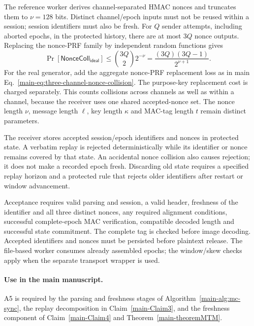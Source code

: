 \documentclass[journal]{IEEEtran}
\theoremstyle{definition}
\theoremstyle{game}
\begin{document}
The reference worker derives channel-separated HMAC nonces and truncates
them to $\nu=128$ bits. Distinct channel/epoch inputs must not be reused
within a session; session identifiers must also be fresh. For $Q$ sender attempts, including aborted epochs,
in the protected history, there are at most $3Q$ nonce outputs.
Replacing the nonce-PRF family by independent random functions gives
\begin{equation}\label{supp-eq:nonce-collision}
\Pr[\mathsf{NonceColl}_{\mathsf{ideal}}]
\le\binom{3Q}{2}2^{-\nu}
=\frac{(3Q)(3Q-1)}{2^{\nu+1}}.
\end{equation}
For the real generator, add the aggregate nonce-PRF replacement loss
as in main Eq.~\eqref{main-eq:three-channel-nonce-collision}.
The purpose-key replacement cost is charged separately. This counts
collisions across channels as well as within a channel, because the
receiver uses one shared accepted-nonce set.
The nonce length $\nu$, message length $\ell$, key length $\kappa$ and
MAC-tag length $t$ remain distinct parameters.

The receiver stores accepted session/epoch identifiers and nonces in
protected state. A verbatim replay is rejected deterministically while
its identifier or nonce remains covered by that state. An accidental
nonce collision also causes rejection; it does not make a recorded epoch
fresh. Discarding old state requires a specified replay horizon and a
protected rule that rejects older identifiers after restart or window
advancement.

Acceptance requires valid parsing and session, a valid header, freshness
of the identifier and all three distinct nonces, any required alignment
conditions, successful complete-epoch MAC verification, compatible decoded
length and successful state commitment. The complete tag is checked before
image decoding. Accepted identifiers and nonces must be persisted before
plaintext release. The file-based worker consumes already assembled epochs;
the window/skew checks apply when the separate transport wrapper is used.

\paragraph{Use in the main manuscript.}
A5 is required by the parsing and freshness stages of
Algorithm~\ref{main-alg:mc-sync}, the replay decomposition in
Claim~\ref{main-Claim3}, and the
freshness component of Claim~\ref{main-Claim4} and
Theorem~\ref{main-theoremMTM}.
\end{document}
